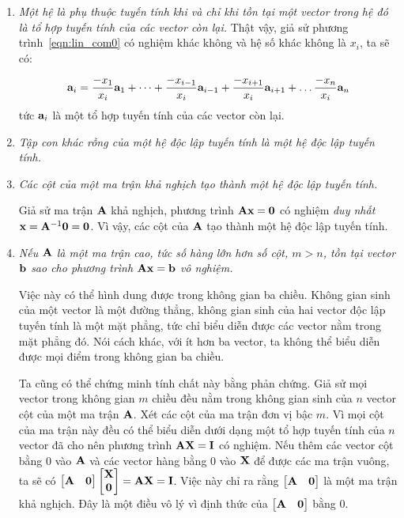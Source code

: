 \begin{enumerate}
\item \textit{Một hệ là phụ thuộc tuyến tính khi và chỉ khi tồn tại một
vector trong hệ đó là tổ hợp tuyến tính của các vector còn lại. } Thật vậy,
giả sử phương trình~\eqref{eqn:lin_com0} có nghiệm khác không và hệ số khác không là $x_i$, ta sẽ có:

\begin{equation}
\mathbf{a}_i = \frac{-x_1}{x_i} \mathbf{a}_1 + \dots + \frac{-x_{i-1}}{x_i}\mathbf{a}_{i-1} +
\frac{-x_{i+1}}{x_i}\mathbf{a}_{i+1} + \dots \frac{-x_n}{x_i}\mathbf{a}_n
\end{equation}
tức $\mathbf{a}_i$ là một tổ hợp tuyến tính của các vector còn lại. %


\item \textit{Tập con khác rỗng của một hệ độc lập tuyến tính là một hệ độc
lập tuyến tính.}



\item \textit{Các cột của một ma trận khả nghịch tạo thành một hệ độc lập
tuyến tính.}

Giả sử ma trận $\mathbf{A}$ khả nghịch, phương trình $\mathbf{A}\mathbf{x} = \mathbf{0}$ có
nghiệm \textit{duy nhất} $\mathbf{x} = \mathbf{A}^{-1}\mathbf{0} = \mathbf{0}$. Vì vậy,
các cột của $\mathbf{A}$ tạo thành một hệ độc lập tuyến tính.


\item \textit{Nếu $\mathbf{A}$ là một ma trận cao, tức số hàng lớn hơn số cột, $m >
n$, tồn tại vector $\mathbf{b}$ sao cho phương trình $\mathbf{A}\mathbf{x} = \mathbf{b}$ vô nghiệm. }

Việc này có thể hình dung được trong không gian ba chiều. Không gian sinh
của một vector là một đường thẳng, không gian sinh của hai vector độc lập
tuyến tính là một mặt phẳng, tức chỉ biểu diễn được các vector nằm trong mặt
phẳng đó. Nói cách khác, với ít hơn ba vector, ta không thể biểu diễn được
mọi điểm trong không gian ba chiều.

Ta cũng có thể chứng minh tính chất này bằng phản chứng. Giả sử mọi vector
trong không gian $m$ chiều đều nằm trong không gian sinh của $n$ vector cột
của một ma trận $\mathbf{A}$. Xét các cột của ma trận đơn vị bậc $m$. Vì mọi cột
của ma trận này đều có thể biểu diễn dưới dạng một tổ hợp tuyến tính của $n$
vector đã cho nên phương trình $\mathbf{A}\mathbf{X} = \mathbf{I}$ có nghiệm. Nếu thêm các vector
cột bằng 0 vào $\mathbf{A}$ và các vector hàng bằng 0 vào $\mathbf{X}$ để được các ma trận
vuông, ta sẽ có $\left[\begin{matrix} \mathbf{A} & \mathbf{0} \end{matrix}\right] \left[\begin{matrix} \mathbf{X} \\
\mathbf{0} \end{matrix}\right] = \mathbf{A}\mathbf{X} = \mathbf{I}$. Việc này chỉ ra rằng $\left[\begin{matrix} \mathbf{A} & \mathbf{0} \end{matrix}\right]$ là
một ma trận khả nghịch. Đây là một điều vô lý vì định thức của $\left[\begin{matrix} \mathbf{A} &
\mathbf{0} \end{matrix}\right]$ bằng 0.


\end{enumerate}
